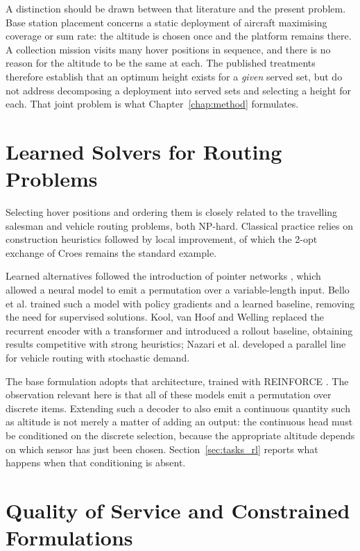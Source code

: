 A distinction should be drawn between that literature and the present problem. Base station placement concerns a static deployment of aircraft maximising coverage or sum rate: the altitude is chosen once and the platform remains there. A collection mission visits many hover positions in sequence, and there is no reason for the altitude to be the same at each. The published treatments therefore establish that an optimum height exists for a \emph{given} served set, but do not address decomposing a deployment into served sets and selecting a height for each. That joint problem is what Chapter~\ref{chap:method} formulates.

\section{Learned Solvers for Routing Problems}
\label{sec:lit_learned}

Selecting hover positions and ordering them is closely related to the travelling salesman and vehicle routing problems, both NP-hard. Classical practice relies on construction heuristics followed by local improvement, of which the 2-opt exchange of Croes \cite{croes1958method} remains the standard example.

Learned alternatives followed the introduction of pointer networks \cite{vinyals2015pointer}, which allowed a neural model to emit a permutation over a variable-length input. Bello et al. \cite{bello2016neural} trained such a model with policy gradients and a learned baseline, removing the need for supervised solutions. Kool, van Hoof and Welling \cite{kool2019attention} replaced the recurrent encoder with a transformer \cite{vaswani2017attention} and introduced a rollout baseline, obtaining results competitive with strong heuristics; Nazari et al. \cite{nazari2018reinforcement} developed a parallel line for vehicle routing with stochastic demand.

The base formulation adopts that architecture, trained with REINFORCE \cite{williams1992simple}. The observation relevant here is that all of these models emit a permutation over discrete items. Extending such a decoder to also emit a continuous quantity such as altitude is not merely a matter of adding an output: the continuous head must be conditioned on the discrete selection, because the appropriate altitude depends on which sensor has just been chosen. Section~\ref{sec:tasks_rl} reports what happens when that conditioning is absent.

\section{Quality of Service and Constrained Formulations}
\label{sec:lit_qos}

